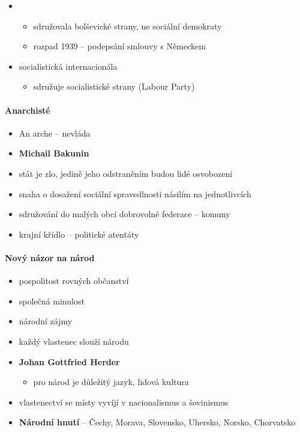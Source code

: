 \begin{itemize}
\begin{itemize}
	\item {}
		\begin{itemize}
		\item sdružovala bolševické strany, ne sociální demokraty
		\item rozpad 1939 -- podepsání smlouvy s Německem
		\end{itemize}
	\item socialistická internacionála
		\begin{itemize}
		\item sdružuje socialistické strany (Labour Party)
		\end{itemize}
	\end{itemize}
\end{itemize}

\paragraph{Anarchisté}
\begin{itemize}
\item An arche -- nevláda
\item \textbf{Michail Bakunin}
\item stát je zlo, jedině jeho odstraněním budou lidé osvobozeni
\item snaha o dosažení sociální spravedlnosti násilím na jednotlivcích
\item sdružování do malých obcí dobrovolné federace -- komuny
\item krajní křídlo -- politické atentáty
\end{itemize}

\paragraph{Nový názor na národ}
\begin{itemize}
\item pospolitost rovných občanství
\item společná minulost
\item národní zájmy
\item každý vlastenec slouží národu
\item \textbf{Johan Gottfried Herder}
	\begin{itemize}
	\item pro národ je důležitý jazyk, lidová kultura
	\end{itemize}
\item vlastenectví se místy vyvíjí v nacionalismus a šovinismus
\item \textbf{Národní hnutí} -- Čechy, Morava, Slovensko, Uhersko, Norsko, Chorvatsko
\end{itemize}

